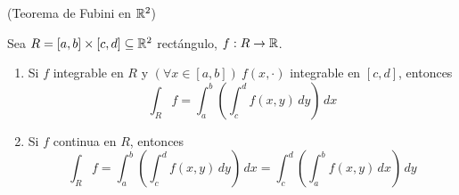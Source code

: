 %

 

\begin{teorema}{\rm (Teorema de Fubini en $\mathbb{R}^2$)}\label{teo:FubiniR2}

Sea $ R = [a, b] \times [c, d] \subseteq \mathbb{R}^2 $ rect\'angulo, $f: R
\to \mathbb{R}$.
\begin{enumerate}
    \item Si $ f $ integrable en $ R $ y $ (\forall x \in [a, b])
    \:f(x, \cdot) $ integrable en $ [c, d] $, entonces
        \[ \int_R f = \int_a^b\left(\int_c^d f(x,y) \, dy\right)\, dx\]
    \item Si $ f $ continua en $ R $, entonces
        \[ \int_R f = \int_a^b\left(\int_c^d f(x,y)\,dy\right)\,dx
        = \int_c^d\left(\int_a^b f(x,y)\,dx\right)\,dy \]
\end{enumerate}
\end{teorema}

